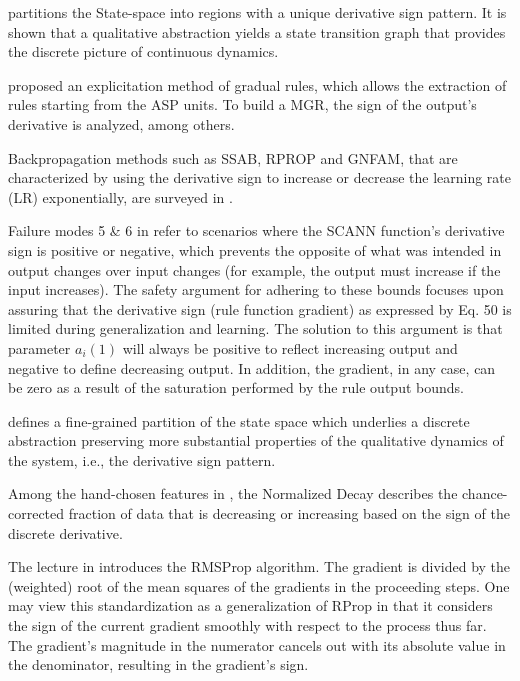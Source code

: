 \documentclass[11pt]{book}
\begin{document}
\cite{de2003qualitative} partitions the State-space into regions
with a unique derivative sign pattern. It is shown that a qualitative
abstraction yields a state transition graph that provides the discrete
picture of continuous dynamics.

\cite{salgado2003neuro} proposed an explicitation method of gradual
rules, which allows the extraction of rules starting from the ASP
units. To build a MGR, the sign of the output's derivative is analyzed,
among others.

Backpropagation methods such as SSAB, RPROP and GNFAM, that are characterized
by using the derivative sign to increase or decrease the learning
rate (LR) exponentially, are surveyed in \cite{allard2004neural}.

Failure modes 5 \& 6 in \cite{kurd2005artificial} refer to scenarios
where the SCANN function's derivative sign is positive or negative,
which prevents the opposite of what was intended in output changes
over input changes (for example, the output must increase if the input
increases). The safety argument for adhering to these bounds focuses
upon assuring that the derivative sign (rule function gradient) as
expressed by Eq. 50 is limited during generalization and learning.
The solution to this argument is that parameter $a_{i}\left(1\right)$
will always be positive to reflect increasing output and negative
to define decreasing output. In addition, the gradient, in any case,
can be zero as a result of the saturation performed by the rule output
bounds.

\cite{batt2008symbolic} defines a fine-grained partition of the state
space which underlies a discrete abstraction preserving more substantial
properties of the qualitative dynamics of the system, i.e., the derivative
sign pattern.

Among the hand-chosen features in \cite{wulsin2011modeling}, the
Normalized Decay describes the chance-corrected fraction of data that
is decreasing or increasing based on the sign of the discrete derivative.

The lecture in \cite{hinton2012neural} introduces the RMSProp algorithm.
The gradient is divided by the (weighted) root of the mean squares
of the gradients in the proceeding steps. One may view this standardization
as a generalization of RProp in that it considers the sign of the
current gradient smoothly with respect to the process thus far. The
gradient's magnitude in the numerator cancels out with its absolute
value in the denominator, resulting in the gradient's sign.
\end{document}
